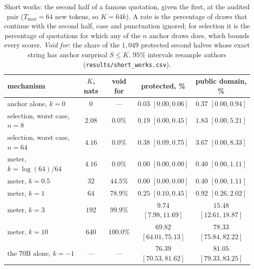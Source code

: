 \begin{table}[h]
\centering\footnotesize
\caption{Short works: the second half of a famous quotation, given the first, at the audited pair
($T_{\max} = 64$ new tokens, so $K = 64k$). A rate is the percentage of draws that continue with the second
half, case and punctuation ignored; for selection it is the percentage of quotations for which any of the $n$
anchor draws does, which bounds every scorer. \emph{Void for}: the share of the $1{,}049$ protected second
halves whose exact string has anchor surprisal $S \le K$. $95\%$ intervals resample authors
(\texttt{results/\allowbreak short\_\allowbreak works.csv}).}\label{tab:shortworks}
\setlength{\tabcolsep}{4pt}
\begin{tabular}{@{}lcccc@{}}
\toprule
mechanism & $K$, nats & void for & protected, \% & public domain, \% \\
\midrule
anchor alone, $k=0$ & $0$ & --- & $0.03$ $[0.00, 0.06]$ & $0.37$ $[0.00, 0.94]$ \\
selection, worst case, $n=8$ & $2.08$ & $0.0\%$ & $0.19$ $[0.00, 0.45]$ & $1.83$ $[0.00, 5.21]$ \\
selection, worst case, $n=64$ & $4.16$ & $0.0\%$ & $0.38$ $[0.09, 0.75]$ & $3.67$ $[0.00, 8.33]$ \\
meter, $k=\log(64)/64$ & $4.16$ & $0.0\%$ & $0.00$ $[0.00, 0.00]$ & $0.40$ $[0.00, 1.11]$ \\
meter, $k=0.5$ & $32$ & $44.5\%$ & $0.00$ $[0.00, 0.00]$ & $0.40$ $[0.00, 1.11]$ \\
meter, $k=1$ & $64$ & $78.9\%$ & $0.25$ $[0.10, 0.45]$ & $0.92$ $[0.26, 2.02]$ \\
meter, $k=3$ & $192$ & $99.9\%$ & $9.74$ $[7.98, 11.69]$ & $15.48$ $[12.61, 18.87]$ \\
meter, $k=10$ & $640$ & $100.0\%$ & $69.82$ $[64.01, 75.13]$ & $78.33$ $[75.84, 82.22]$ \\
the $70$B alone, $k=-1$ & --- & --- & $76.39$ $[70.53, 81.62]$ & $81.05$ $[79.33, 83.25]$ \\
\bottomrule
\end{tabular}
\end{table}

